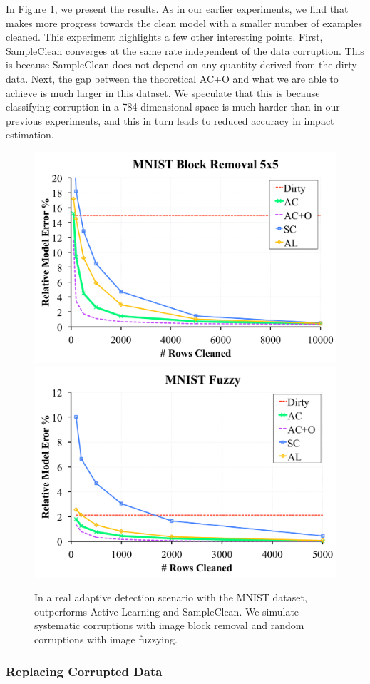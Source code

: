 \fi

In Figure \ref{mnist}, we present the results.
As in our earlier experiments, we find that \sys makes more progress towards the clean model with a smaller number of examples cleaned.
This experiment highlights a few other interesting points.
First, SampleClean converges at the same rate independent of the data corruption.
This is because SampleClean does not depend on any quantity derived from the dirty data.
Next, the gap between the theoretical AC+O and what we are able to achieve is much larger in this dataset.
We speculate that this is because classifying corruption in a 784 dimensional space is much harder than in our previous experiments, and this in turn leads to reduced accuracy in impact estimation.

\begin{figure}[ht]
\centering
 \includegraphics[width=0.49\columnwidth]{exp/exp7a.pdf}
 \includegraphics[width=0.49\columnwidth]{exp/exp7b.pdf}
 \caption{In a real adaptive detection scenario with the MNIST dataset, \sys outperforms Active Learning and SampleClean. We simulate systematic corruptions with image block removal and random corruptions with image fuzzying.  \label{mnist}}
\end{figure}

\subsubsection{Replacing Corrupted Data}
